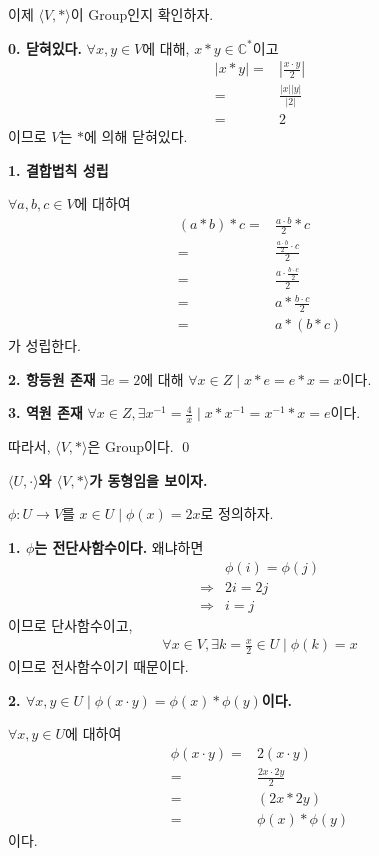 \documentclass{article}
\begin{document}
이제 $\langle V, * \rangle$이 Group인지 확인하자.

\textbf{0. 닫혀있다.}
$\forall x, y \in V$에 대해, $x * y \in \mathbb{C}^*$이고
\begin{align*}
\left| x * y \right| =& \left| \frac{x \cdot y}{2} \right|
\\ =& \frac{\left| x \right| \left| y \right| }{\left| 2 \right|}
\\ =& 2
\end{align*}이므로 $V$는 $*$에 의해 닫혀있다.

\textbf{1. 결합법칙 성립}

$\forall a, b, c \in V$에 대하여
\begin{align*}
(a * b) * c =& \frac{a \cdot b}{2} * c
\\ =& \frac{\frac{a \cdot b}{2} \cdot c} {2}
\\ =& \frac{a \cdot \frac{b \cdot c}{2}} {2}
\\ =& a * \frac{b \cdot c}{2}
\\ =& a * (b * c)
\end{align*}가 성립한다.

\textbf{2. 항등원 존재}
$\exists e = 2$에 대해 $\forall x \in Z \mid x * e = e * x = x$이다.

\textbf{3. 역원 존재}
$\forall x \in Z, \exists x^{-1} = \frac{4}{x} \mid x * x^{-1} = x^{-1} * x = e$이다.

따라서, $\langle V, * \rangle$은 Group이다. \qed

\textbf{$\langle U, \cdot \rangle$와 $\langle V, * \rangle$가 동형임을 보이자.}

$\phi : U \rightarrow V$를 $x \in U \mid \phi(x) = 2x$로 정의하자.

\textbf{1. $\phi$는 전단사함수이다.}
왜냐하면
\begin{align*}
&\phi(i) = \phi(j)
\\ \Rightarrow& 2i = 2j
\\ \Rightarrow& i = j
\end{align*}이므로 단사함수이고,
\begin{align*}
\forall x \in V, \exists k = \frac{x}{2} \in U \mid \phi(k) = x
\end{align*}이므로 전사함수이기 때문이다.

\textbf{2. $\forall x, y \in U \mid \phi(x \cdot y) = \phi(x) * \phi(y)$이다.}

$\forall x, y \in U$에 대하여
\begin{align*}
\phi(x \cdot y) =& 2(x \cdot y)
\\ =& \frac{2x \cdot 2y}{2}
\\ =& (2x * 2y)
\\ =& \phi(x) * \phi(y)
\end{align*}이다.
\end{document}
